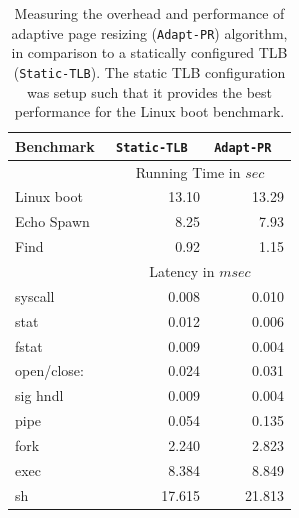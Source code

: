 \documentclass[10pt,twocolumn]{article}
\begin{document}
\begin{table}
\centering
      \begin{tabular}{|l| r r |} \hline
        Benchmark\verb, ,& {\tt Static-TLB} \verb, ,& {\tt Adapt-PR} \verb, , \\ \hline

     & \multicolumn{2}{c|}{Running Time in $sec$}\\ \cline {2-3}
Linux boot	&	13.10	&	13.29\\
Echo Spawn	&	8.25	&	7.93\\
Find	&	0.92	&	1.15\\
\cline{2-3}
     & \multicolumn{2}{c|}{Latency in $msec$}\\  \cline{2-3}
syscall	&	0.008	&	0.010\\
stat	 &	0.012	&	0.006\\
fstat	&	0.009	&	0.004\\
open/close:	&	0.024	&	0.031\\
sig hndl	&	0.009	&	0.004\\
pipe 	&	0.054	&	0.135\\
fork	&	2.240	&	2.823\\
exec	&	8.384	&	8.849\\
sh	&	17.615	&	21.813\\
 \hline
      \end{tabular}
\label{tab:adaptive_tlb_resizing}
\caption{Measuring the overhead and performance of adaptive page resizing ({\tt Adapt-PR}) algorithm, in comparison to
a statically configured TLB ({\tt Static-TLB}). The static TLB configuration was setup such that it provides the best performance for the Linux boot benchmark.}
\end{table} 
\end{document}
